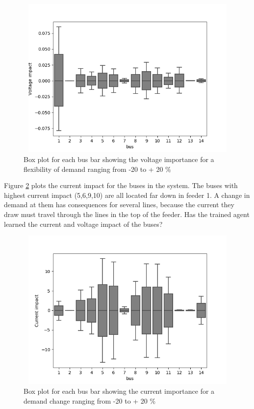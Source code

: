 \documentclass[class=book, crop=false]{standalone}
\begin{document}
\begin{figure}[h]
    \center
\includegraphics[height=8cm, width=12cm]{figures/voltage_impact.png}
    \caption[size = 9]{Box plot for each bus bar showing the voltage importance for a flexibility of demand ranging from -20 to + 20 \%}
    \label{fig:discussion:voltage_impact}
\end{figure}

Figure \ref{fig:discussion:current_impact} plots the current impact for the buses in the system. The buses with highest current impact (5,6,9,10) are all located far down in feeder 1. A change in demand at them has consequences for several lines, because the current they draw must travel through the lines in the top of the feeder. Has the trained agent learned the current and voltage impact of the buses?    


\begin{figure}[h]
    \center
\includegraphics[height=8cm, width=12cm]{figures/current_impact.png}
    \caption[size = 9]{Box plot for each bus bar showing the current importance for a demand change ranging from -20 to + 20 \%}
    \label{fig:discussion:current_impact}
\end{figure}
\end{document}
